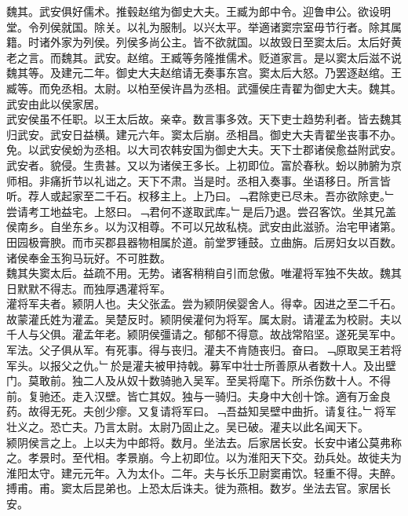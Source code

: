 \documentclass{zhvt-classic}
\begin{document}
\hspace*{2em}魏其。武安俱好儒术。推毂赵绾为御史大夫。王臧为郎中令。迎鲁申公。欲设明堂。令列侯就国。除关。以礼为服制。以兴太平。举適诸窦宗室毋节行者。除其属籍。时诸外家为列侯。列侯多尚公主。皆不欲就国。以故毁日至窦太后。太后好黄老之言。而魏其。武安。赵绾。王臧等务隆推儒术。贬道家言。是以窦太后滋不说魏其等。及建元二年。御史大夫赵绾请无奏事东宫。窦太后大怒。乃罢逐赵绾。王臧等。而免丞相。太尉。以柏至侯许昌为丞相。武彊侯庄青翟为御史大夫。魏其。武安由此以侯家居。\\
\hspace*{2em}武安侯虽不任职。以王太后故。亲幸。数言事多效。天下吏士趋势利者。皆去魏其归武安。武安日益横。建元六年。窦太后崩。丞相昌。御史大夫青翟坐丧事不办。免。以武安侯蚡为丞相。以大司农韩安国为御史大夫。天下士郡诸侯愈益附武安。\\
\hspace*{2em}武安者。貌侵。生贵甚。又以为诸侯王多长。上初即位。富於春秋。蚡以肺腑为京师相。非痛折节以礼诎之。天下不肃。当是时。丞相入奏事。坐语移日。所言皆听。荐人或起家至二千石。权移主上。上乃曰。﹁君除吏已尽未。吾亦欲除吏。﹂尝请考工地益宅。上怒曰。﹁君何不遂取武库。﹂是后乃退。尝召客饮。坐其兄盖侯南乡。自坐东乡。以为汉相尊。不可以兄故私桡。武安由此滋骄。治宅甲诸第。田园极膏腴。而市买郡县器物相属於道。前堂罗锺鼓。立曲旃。后房妇女以百数。诸侯奉金玉狗马玩好。不可胜数。\\
\hspace*{2em}魏其失窦太后。益疏不用。无势。诸客稍稍自引而怠傲。唯灌将军独不失故。魏其日默默不得志。而独厚遇灌将军。\\
\hspace*{2em}灌将军夫者。颍阴人也。夫父张孟。尝为颍阴侯婴舍人。得幸。因进之至二千石。故蒙灌氏姓为灌孟。吴楚反时。颍阴侯灌何为将军。属太尉。请灌孟为校尉。夫以千人与父俱。灌孟年老。颍阴侯彊请之。郁郁不得意。故战常陷坚。遂死吴军中。军法。父子俱从军。有死事。得与丧归。灌夫不肯随丧归。奋曰。﹁原取吴王若将军头。以报父之仇。﹂於是灌夫被甲持戟。募军中壮士所善原从者数十人。及出壁门。莫敢前。独二人及从奴十数骑驰入吴军。至吴将麾下。所杀伤数十人。不得前。复驰还。走入汉壁。皆亡其奴。独与一骑归。夫身中大创十馀。適有万金良药。故得无死。夫创少瘳。又复请将军曰。﹁吾益知吴壁中曲折。请复往。﹂将军壮义之。恐亡夫。乃言太尉。太尉乃固止之。吴已破。灌夫以此名闻天下。\\
\hspace*{2em}颍阴侯言之上。上以夫为中郎将。数月。坐法去。后家居长安。长安中诸公莫弗称之。孝景时。至代相。孝景崩。今上初即位。以为淮阳天下交。劲兵处。故徙夫为淮阳太守。建元元年。入为太仆。二年。夫与长乐卫尉窦甫饮。轻重不得。夫醉。搏甫。甫。窦太后昆弟也。上恐太后诛夫。徙为燕相。数岁。坐法去官。家居长安。\\
\end{document}
